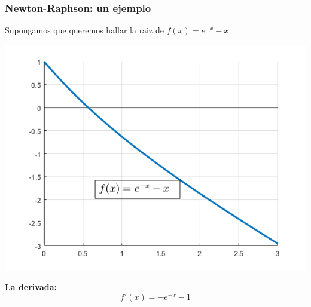 \documentclass[xcolor=svgnames]{beamer} %
\theoremstyle{plain}
\renewcommand{\textbf}[1]{{\bfseries\textcolor{redUnq2}{#1}}}
\theoremstyle{definition}
\begin{document}
\begin{frame}
	\frametitle{Newton-Raphson: un ejemplo}

Supongamos que queremos hallar la raiz de $f(x) = e^{-x} -x$


\begin{minipage}{.7\linewidth}
\includegraphics[width=\linewidth]{nr_example/f.png} 

\end{minipage}  \begin{minipage}{.25\linewidth}

\textbf{La derivada:}
$$ f'(x) = -e^{-x} - 1$$
	\end{minipage}
\end{frame}
\end{document}

